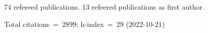 74 refereed publications. 13 refeered publications as first author.

Total citations~=~2899; h-index~=~29 (2022-10-21)